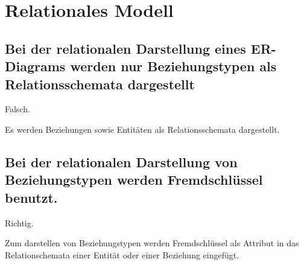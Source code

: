 \documentclass{scrartcl}
\begin{document}
\maketitle

\section{Relationales Modell}
\subsection{Bei der relationalen Darstellung eines ER-Diagrams
werden nur Beziehungstypen als Relationsschemata dargestellt}
Falsch.

Es werden Beziehungen sowie Entitäten als Relationsschemata dargestellt.

\subsection{Bei der relationalen Darstellung von Beziehungstypen
werden Fremdschlüssel benutzt.}
Richtig.

Zum darstellen von Beziehungstypen werden Fremdschlüssel als Attribut in das Relationschemata einer Entität oder einer Beziehung eingefügt.
\end{document}

